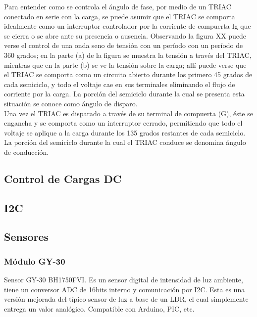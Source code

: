 Para entender como se controla el ángulo de fase, por medio de un TRIAC conectado en serie con la carga, se puede asumir que el TRIAC se comporta idealmente como un interruptor controlador por la corriente de compuerta Ig que se cierra o se abre ante su presencia o ausencia. Observando la figura XX puede verse el control de una onda seno de tensión con un período con un período de 360 grados; en la parte (a) de la figura se muestra la tensión a través del TRIAC, mientras que en la parte (b) se ve la tensión sobre la carga; allí puede verse que el TRIAC se comporta como un circuito abierto durante los primero 45 grados de cada semiciclo, y todo el voltaje cae en sus terminales eliminando el flujo de corriente por la carga. La porción del semiciclo durante la cual se presenta esta situación se conoce como ángulo de disparo.\\

Una vez el TRIAC es disparado a través de su terminal de compuerta (G), éste se engancha y se comporta como un interruptor cerrado, permitiendo que todo el voltaje se aplique a la carga durante los 135 grados restantes de cada semiciclo. La porción del semiciclo durante la cual el TRIAC conduce se denomina ángulo de conducción.\\


\subsection{Control de Cargas DC}


\subsection{I2C}

\subsection{Sensores}

\subsubsection{Módulo GY-30}

Sensor GY-30 BH1750FVI. Es un sensor digital de intensidad de luz ambiente, tiene un conversor ADC de 16bits interno y comunicación por I2C. Esta es una versión mejorada del típico sensor de luz a base de un LDR, el cual simplemente entrega un valor analógico. Compatible con Arduino, PIC, etc. 

